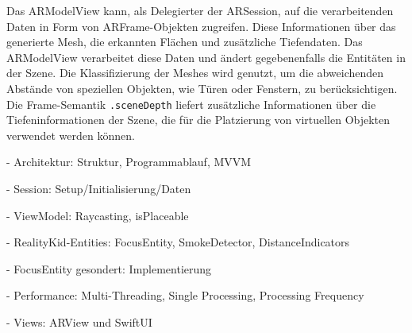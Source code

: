 Das ARModelView kann, als Delegierter der ARSession, auf die verarbeitenden Daten in Form von ARFrame-Objekten zugreifen. Diese Informationen über das generierte Mesh, die erkannten Flächen und zusätzliche Tiefendaten. Das ARModelView verarbeitet diese Daten und ändert gegebenenfalls die Entitäten in der Szene. Die Klassifizierung der Meshes wird genutzt, um die abweichenden Abstände von speziellen Objekten, wie Türen oder Fenstern, zu berücksichtigen. Die Frame-Semantik \texttt{.sceneDepth} liefert zusätzliche Informationen über die Tiefeninformationen der Szene, die für die Platzierung von virtuellen Objekten verwendet werden können.

- Architektur: Struktur, Programmablauf, MVVM

- Session: Setup/Initialisierung/Daten

- ViewModel: Raycasting, isPlaceable

- RealityKid-Entities: FocusEntity, SmokeDetector, DistanceIndicators

- FocusEntity gesondert: Implementierung

- Performance: Multi-Threading, Single Processing, Processing Frequency

- Views: ARView und SwiftUI